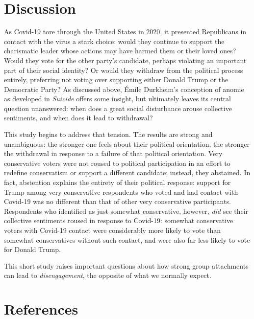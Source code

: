 \documentclass[
  12pt,
]{article}
\begin{document}
\hypertarget{discussion}{%
\section*{Discussion}\label{discussion}}

As Covid-19 tore through the United States in 2020, it presented Republicans in contact with the virus a stark choice: would they continue to support the charismatic leader whose actions may have harmed them or their loved ones? Would they vote for the other party's candidate, perhaps violating an important part of their social identity? Or would they withdraw from the political process entirely, preferring not voting over supporting either Donald Trump or the Democratic Party? As discussed above, Émile Durkheim's conception of anomie as developed in \emph{Suicide} offers some insight, but ultimately leaves its central question unanswered: when does a great social disturbance arouse collective sentiments, and when does it lead to withdrawal?

This study begins to address that tension. The results are strong and unambiguous: the stronger one feels about their political orientation, the stronger the withdrawal in response to a failure of that political orientation. Very conservative voters were not roused to political participation in an effort to redefine conservatism or support a different candidate; instead, they abstained. In fact, abstention explains the entirety of their political response: support for Trump among very conservative respondents who voted and had contact with Covid-19 was no different than that of other very conservative participants. Respondents who identified as just somewhat conservative, however, \emph{did} see their collective sentiments roused in response to Covid-19: somewhat conservative voters with Covid-19 contact were considerably more likely to vote than somewhat conservatives without such contact, and were also far less likely to vote for Donald Trump.

This short study raises important questions about how strong group attachments can lead to \emph{disengagement}, the opposite of what we normally expect.

\newpage

\hypertarget{references}{%
\section*{References}\label{references}}
\end{document}
